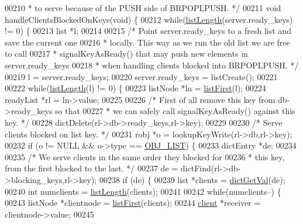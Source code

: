 \begin{DoxyCode}
00210 \textcolor{comment}{ * to serve because of the PUSH side of BRPOPLPUSH. */}
00211 \textcolor{keywordtype}{void} handleClientsBlockedOnKeys(\textcolor{keywordtype}{void}) \{
00212     \textcolor{keywordflow}{while}(\hyperlink{adlist_8h_afde0ab079f934670e82119b43120e94b}{listLength}(server.ready\_keys) != 0) \{
00213         list *l;
00214 
00215         \textcolor{comment}{/* Point server.ready\_keys to a fresh list and save the current one}
00216 \textcolor{comment}{         * locally. This way as we run the old list we are free to call}
00217 \textcolor{comment}{         * signalKeyAsReady() that may push new elements in server.ready\_keys}
00218 \textcolor{comment}{         * when handling clients blocked into BRPOPLPUSH. */}
00219         l = server.ready\_keys;
00220         server.ready\_keys = listCreate();
00221 
00222         \textcolor{keywordflow}{while}(\hyperlink{adlist_8h_afde0ab079f934670e82119b43120e94b}{listLength}(l) != 0) \{
00223             listNode *ln = \hyperlink{adlist_8h_aa8dc514bbe217bb2e87c1c77cfa84690}{listFirst}(l);
00224             readyList *rl = ln->value;
00225 
00226             \textcolor{comment}{/* First of all remove this key from db->ready\_keys so that}
00227 \textcolor{comment}{             * we can safely call signalKeyAsReady() against this key. */}
00228             dictDelete(rl->db->ready\_keys,rl->key);
00229 
00230             \textcolor{comment}{/* Serve clients blocked on list key. */}
00231             robj *o = lookupKeyWrite(rl->db,rl->key);
00232             \textcolor{keywordflow}{if} (o != NULL && o->type == \hyperlink{server_8h_a4a5f22a280949c97a0cb0d4213275126}{OBJ\_LIST}) \{
00233                 dictEntry *de;
00234 
00235                 \textcolor{comment}{/* We serve clients in the same order they blocked for}
00236 \textcolor{comment}{                 * this key, from the first blocked to the last. */}
00237                 de = dictFind(rl->db->blocking\_keys,rl->key);
00238                 \textcolor{keywordflow}{if} (de) \{
00239                     list *clients = \hyperlink{dict_8h_ae8d2cc391873b2bea2b87c4f80f43120}{dictGetVal}(de);
00240                     \textcolor{keywordtype}{int} numclients = \hyperlink{adlist_8h_afde0ab079f934670e82119b43120e94b}{listLength}(clients);
00241 
00242                     \textcolor{keywordflow}{while}(numclients--) \{
00243                         listNode *clientnode = \hyperlink{adlist_8h_aa8dc514bbe217bb2e87c1c77cfa84690}{listFirst}(clients);
00244                         \hyperlink{structclient}{client} *receiver = clientnode->value;
00245 

\end{DoxyCode}
